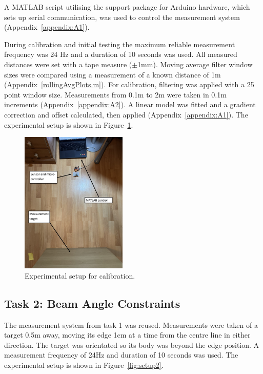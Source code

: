 \documentclass[a4paper,12pt]{article}
\begin{document}
A MATLAB script utilising the support package for Arduino hardware, which sets up serial communication, was used to control the measurement system (Appendix~\ref{appendix:A1}).

During calibration and initial testing the maximum reliable measurement frequency was 24 Hz and a duration of 10 seconds was used.
All measured distances were set with a tape measure ($\pm$1mm).
Moving average filter window sizes were compared using a measurement of a known distance of 1m (Appendix~\ref{rollingAvgPlots.m}).
For calibration, filtering was applied with a 25 point window size. Measurements from 0.1m to 2m were taken in 0.1m increments (Appendix~\ref{appendix:A2}). A linear model was fitted and a gradient correction and offset calculated, then applied (Appendix~\ref{appendix:A1}).
The experimental setup is shown in Figure~\ref{fig:setup}.

\begin{figure}[htbp]
    \centering
    \includegraphics[width=0.45\textwidth]{figs/page01.jpg}
    \caption{Experimental setup for calibration.}
    \label{fig:setup}
\end{figure}

\break

\subsection{Task 2: Beam Angle Constraints}
The measurement system from task 1 was reused. Measurements were taken of a target 0.5m away, moving its edge 1cm at a time from the centre line in either direction. The target was orientated so its body was beyond the edge position. A measurement frequency of 24Hz and duration of 10 seconds was used. 
The experimental setup is shown in Figure~\ref{fig:setup2}.
\end{document}
